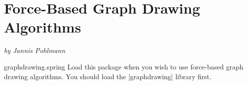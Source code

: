 %
%
%

\section{Force-Based Graph Drawing Algorithms}
\label{section-library-graphdrawing-force-based}

{\emph{by Jannis Pohlmann}}


\begin{tikzlibrary}{graphdrawing.spring}
  Load this package when you wish to use force-based graph drawing
  algorithms. You should load the |graphdrawing| library first.
\end{tikzlibrary}

\ifluatex\relax{}\expandafter\endinput\fi


\subsection{Overview}


...

\begin{key}{/graph drawing/spring layout=\meta{options}}
  \keyalias{tikz}\keyalias{tikz/graphs}
  Similar to the |>| option, this ``generic'' name for a spring layout
  algorithm is not hardwired to any specific algorithm. Rather, users
  can select an algorithm somewhere at the beginning of their program
  and then just write |\graph[spring layout]| to draw a tree.

  The \meta{options} will be forwarded to the currently selected
  algorithm.
\begin{codeexample}[]
\tikz \graph [spring layout] { a -> {b,c} };    
\end{codeexample}
  
  To change the algorithm, change the following key:
  \begin{key}{/graph drawing/spring layout/default algorithm=\meta{algorithm}}
    Set this key to the tree drawing algorithm of your choice. The
    default is currently |standard spring electrical|, but this will change.
  \end{key}
\end{key}



